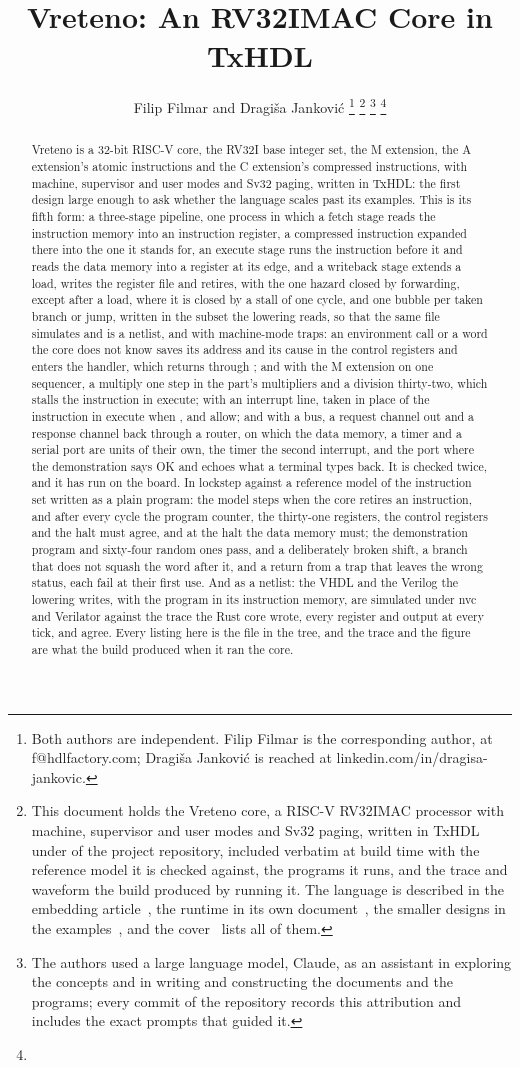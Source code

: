 \documentclass[journal,onecolumn,9pt]{IEEEtran}
\title{Vreteno: An RV32IMAC Core in TxHDL}
\author{Filip Filmar and Dragiša Janković%
\thanks{Both authors are independent. Filip Filmar is the
corresponding author, at f@hdlfactory.com; Dragiša Janković is
reached at linkedin.com/in/dragisa-jankovic.}%
\thanks{This document holds the Vreteno core, a RISC-V RV32IMAC processor
with machine, supervisor and user modes and Sv32 paging,
written in TxHDL under \code{//cpu/vreteno} of the project repository,
included verbatim at build time with the reference model it is checked
against, the programs it runs, and the trace and waveform the build
produced by running it. The language is described in the embedding
article~\cite{embedding}, the runtime in its own
document~\cite{runtime}, the smaller designs in the
examples~\cite{examples}, and the cover~\cite{cover} lists all of them.}%
\thanks{The authors used a large language model, Claude, as an
assistant in exploring the concepts and in writing and constructing
the documents and the programs; every commit of the repository records
this attribution and includes the exact prompts that guided it.}%
\thanks{\buildstamp}}
\begin{document}
\maketitle

\begin{abstract}
Vreteno is a 32-bit RISC-V core, the RV32I base integer set, the M
extension, the A extension's atomic instructions and the C extension's
compressed instructions, with machine, supervisor and user modes and
Sv32 paging, written in
TxHDL: the first design large enough to ask whether the language
scales past its examples. This is its fifth form: a three-stage
pipeline, one process in which a fetch stage reads the instruction
memory into an instruction register, a compressed instruction
expanded there into the one it stands for, an execute stage runs the
instruction before it and reads the data memory into a register at
its edge, and a writeback stage extends a load, writes the register
file and retires, with the one hazard closed by forwarding, except
after a load, where it is closed by a stall of one cycle, and one
bubble per taken branch or jump, written in the subset the lowering
reads, so that the same file simulates and is a netlist, and with
machine-mode traps: an environment call or a word the core does not
know saves its address and its cause in the control registers and
enters the handler, which returns through ; and with
the M extension on one sequencer, a multiply one step in the part's
multipliers and a division thirty-two, which stalls the instruction
in execute; with an interrupt line, taken in place of the
instruction in execute when ,  and
 allow; and with a bus, a request channel out and a
response channel back through a router, on which the data memory, a
timer and a serial port are units of their own, the timer the second
interrupt, and the port where the demonstration says OK and echoes
what a terminal types back. It is checked twice, and it has run on
the board. In lockstep against a reference model of the instruction set
written as a plain program: the model steps when the core retires an
instruction, and after every cycle the program counter, the
thirty-one registers, the control registers and the halt must agree,
and at the halt the data memory must; the demonstration program and
sixty-four random ones pass, and a deliberately broken shift, a
branch that does not squash the word after it, and a return from a
trap that leaves the wrong status, each fail at their first use. And as a netlist: the VHDL
and the Verilog the lowering writes, with the program in its
instruction memory, are simulated under nvc and Verilator against the
trace the Rust core wrote, every register and output at every tick,
and agree. Every listing here
is the file in the tree, and the trace and the figure are what the
build produced when it ran the core.
\end{abstract}
\end{document}
